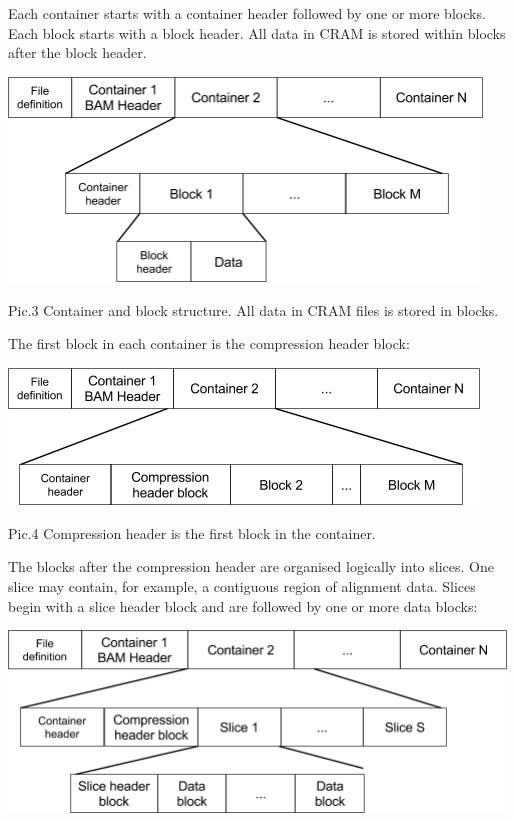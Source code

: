 \documentclass[a4paper]{article}
\begin{document}
Each container starts with a container header followed by one or more blocks. Each 
block starts with a block header. All data in CRAM is stored within blocks after 
the block header.

\includegraphics[width=356pt, height=154pt, keepaspectratio=true]{img/CRAMFileFormat2-1-fig003.png}

Pic.3 Container and block structure. All data in CRAM files is stored in blocks.

The first block in each container is the compression header block:

\includegraphics[width=354pt, height=103pt, keepaspectratio=true]{img/CRAMFileFormat2-1-fig004.png}

Pic.4 Compression header is the first block in the container.

The blocks after the compression header are organised logically into slices. One 
slice may contain, for example, a contiguous region of alignment data. Slices begin 
with a slice header block and are followed by one or more data blocks:

\includegraphics[width=374pt, height=137pt, keepaspectratio=true]{img/CRAMFileFormat2-1-fig005.png}
\end{document}

